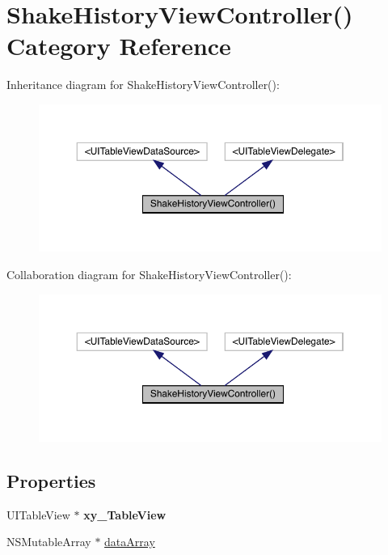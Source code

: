 \hypertarget{category_shake_history_view_controller_07_08}{}\section{Shake\+History\+View\+Controller() Category Reference}
\label{category_shake_history_view_controller_07_08}


Inheritance diagram for Shake\+History\+View\+Controller()\+:\nopagebreak
\begin{figure}[H]
\begin{center}
\leavevmode
\includegraphics[width=350pt]{category_shake_history_view_controller_07_08__inherit__graph}
\end{center}
\end{figure}


Collaboration diagram for Shake\+History\+View\+Controller()\+:\nopagebreak
\begin{figure}[H]
\begin{center}
\leavevmode
\includegraphics[width=350pt]{category_shake_history_view_controller_07_08__coll__graph}
\end{center}
\end{figure}
\subsection*{Properties}
\begin{DoxyCompactItemize}
\item 
\mbox{\label{category_shake_history_view_controller_07_08_a9e24e65d0f6b3ecfceb8f594ae6239a3}} 
U\+I\+Table\+View $\ast$ {\bfseries xy\+\_\+\+Table\+View}
\item 
N\+S\+Mutable\+Array $\ast$ \mbox{\hyperlink{category_shake_history_view_controller_07_08_a7853cf85df03d000e7decd0543a89119}{data\+Array}}
\end{DoxyCompactItemize}


